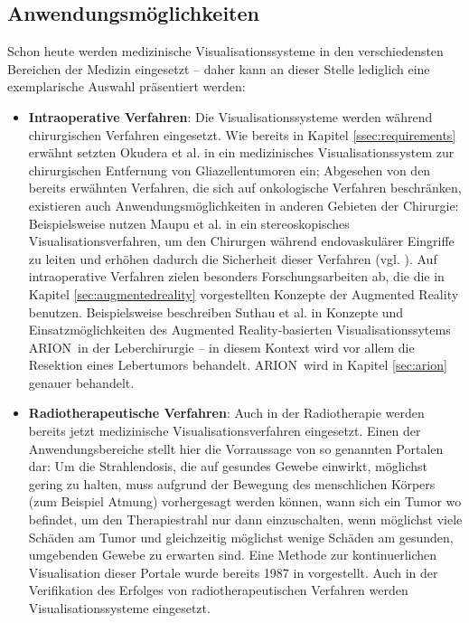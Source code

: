 \documentclass[ngerman,pdftex,paper=A4,DIV=calc,titlepage,12pt]{scrartcl}
\newtheorem[L]{boxedDefinition}{Definition}
\begin{document}
\subsection{Anwendungsmöglichkeiten}\label{ssec:applications}
Schon heute werden medizinische Visualisationssysteme in den verschiedensten Bereichen der Medizin eingesetzt -- daher kann an dieser Stelle lediglich eine exemplarische Auswahl präsentiert werden:
\begin{itemize}
 \item \textbf{Intraoperative Verfahren}: Die Visualisationssysteme werden während chirurgischen Verfahren eingesetzt. Wie bereits in Kapitel \ref{ssec:requirements} erwähnt setzten Okudera et al. in \cite{Okudera1994} ein medizinisches Visualisationssystem zur chirurgischen Entfernung von Gliazellentumoren ein;  Abgesehen von den bereits erwähnten Verfahren, die sich auf onkologische Verfahren beschränken, existieren auch Anwendungsmöglichkeiten in anderen Gebieten der Chirurgie: Beispielsweise nutzen Maupu et al. in \cite{Maupu2005} ein stereoskopisches Visualisationsverfahren, um den Chirurgen während endovaskulärer Eingriffe zu leiten und erhöhen dadurch die Sicherheit dieser Verfahren (vgl. \cite[Abstract]{Maupu2005}). Auf intraoperative Verfahren zielen besonders Forschungsarbeiten ab, die die in Kapitel \vref{sec:augmentedreality} vorgestellten Konzepte der Augmented Reality benutzen. Beispielsweise beschreiben Suthau et al. in \cite{Suthau2002DE}  Konzepte und Einsatzmöglichkeiten des Augmented Reality-basierten Visualisationssytems ARION\texttrademark\ in der Leberchirurgie -- in diesem Kontext wird vor allem die Resektion eines Lebertumors behandelt. ARION\texttrademark\ wird in Kapitel \vref{sec:arion} genauer behandelt.
 \item \textbf{Radiotherapeutische Verfahren}: Auch in der Radiotherapie werden bereits jetzt medizinische Visualisationsverfahren eingesetzt. Einen der Anwendungsbereiche stellt hier die Vorraussage von so genannten Portalen dar: Um die Strahlendosis, die auf gesundes Gewebe einwirkt, möglichst gering zu halten, muss aufgrund der Bewegung des menschlichen Körpers (zum Beispiel Atmung) vorhergesagt werden können, wann sich ein Tumor wo befindet, um den Therapiestrahl nur dann einzuschalten, wenn möglichst viele Schäden am Tumor und gleichzeitig möglichst wenige Schäden am gesunden, umgebenden Gewebe zu erwarten sind. Eine Methode zur kontinuerlichen Visualisation dieser Portale wurde bereits 1987 in \cite{Leong1987} vorgestellt. Auch in der Verifikation des Erfolges von radiotherapeutischen Verfahren werden Visualisationssysteme eingesetzt.

\end{itemize}
\end{document}
